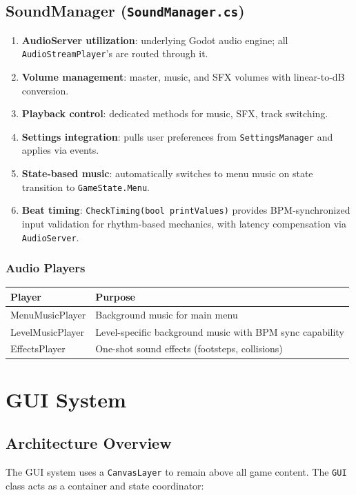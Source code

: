 \documentclass{report}
\begin{document}
\section{SoundManager (\texttt{SoundManager.cs})}
\begin{enumerate}[label=\alph*)]
	\item\textbf{AudioServer utilization}: underlying Godot audio engine; all \texttt{AudioStreamPlayer}'s are routed through it.
	\item\textbf{Volume management}: master, music, and SFX volumes with linear-to-dB conversion.
	\item\textbf{Playback control}: dedicated methods for music, SFX, track switching.
	\item\textbf{Settings integration}: pulls user preferences from \texttt{SettingsManager} and applies via events.
	\item\textbf{State-based music}: automatically switches to menu music on state transition to \texttt{GameState.Menu}.
	\item\textbf{Beat timing}: \texttt{CheckTiming(bool printValues)} provides BPM-synchronized input validation for rhythm-based mechanics, with latency compensation via \texttt{AudioServer}.
\end{enumerate}

\subsection{Audio Players}
\begin{longtable}{|l|p{8cm}|}
	\hline
	\textbf{Player}  & \textbf{Purpose}                                         \\
	\hline
	MenuMusicPlayer  & Background music for main menu                           \\
	\hline
	LevelMusicPlayer & Level-specific background music with BPM sync capability \\
	\hline
	EffectsPlayer    & One-shot sound effects (footsteps, collisions)           \\
	\hline
\end{longtable}

\chapter{GUI System}
\section{Architecture Overview}
The GUI system uses a \texttt{CanvasLayer} to remain above all game content. The \texttt{GUI} class acts as a container and state coordinator:
\end{document}

